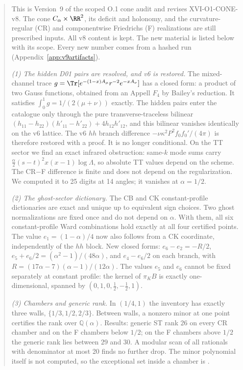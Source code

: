 \begin{abstract}
This is Version~9 of the scoped O.1 cone audit and revises
XVI-O1-CONE-v8. The cone \(C_\alpha\times\RR^2\), its deficit and
holonomy, and the curvature-regular (CR) and componentwise
Friedrichs (F) realizations are still prescribed inputs. All v8
content is kept. The new material is listed below with its scope.
Every new number comes from a hashed run
(Appendix~\ref{app:v9artifacts}).

\emph{(1) The hidden D01 pairs are resolved, and v6 is restored.}
The mixed-channel trace
\(g=\Tr[e^{-(1-x)A_\mu}r^{-2}e^{-xA_\nu}]\) has a closed form: a
product of two Gauss functions, obtained from an Appell \(F_4\)
by Bailey's reduction. It satisfies \(\int_0^1g=1/(2(\mu+\nu))\)
exactly. The hidden pairs enter the catalogue only through the
pure transverse-traceless bilinear
\((h_{11}-h_{22})(h'_{11}-h'_{22})+4h_{12}h'_{12}\), and this
bilinear vanishes identically on the v6 lattice. The v6 \(hh\)
branch difference \(-\nu\kappa^2P^2f_0f_0'/(4\pi)\) is therefore
restored with a proof. It is no longer conditional.
On the TT sector we find an exact infrared obstruction: same-\(k\)
mode sums carry \(\tfrac{\alpha}{2}(s-t)^2x(x-1)\log\Lambda\), so
absolute TT values depend on the scheme. The CR\(-\)F difference
is finite and does not depend on the regularization. We computed
it to 25 digits at 14 angles; it vanishes at \(\alpha=1/2\).

\emph{(2) The ghost-sector dictionary.} The CB and CK
constant-profile dictionaries are exact and unique up to
equivalent sign choices. Two ghost normalizations are fixed once
and do not depend on \(\alpha\). With them, all six
constant-profile Ward combinations hold exactly at all four
certified points. The value \(e_1=(1-\alpha)/4\) now also follows
from a CK coordinate, independently of the \(hh\) block. New
closed forms: \(e_6-e_2=-R/2\), \(e_5+e_6/2=(\alpha^2-1)/(48\alpha)\),
and \(e_4-e_6/2\) on each branch, with
\(R=(17\alpha-7)(\alpha-1)/(12\alpha)\). The values \(e_5\) and
\(e_6\) cannot be fixed separately at constant profile: the kernel
of \(\pi_KB\) is exactly one-dimensional, spanned by
\((0,1,0,\tfrac12,-\tfrac12,1)\).

\emph{(3) Chambers and generic rank.} In \((1/4,1)\) the inventory
has exactly three walls, \(\{1/3,1/2,2/3\}\). Between walls, a
nonzero minor at one point certifies the rank over
\(\mathbb Q(\alpha)\). Results: generic ST rank \(26\) on every CR
chamber and on the F chambers below \(1/2\); on the F chambers
above \(1/2\) the generic rank lies between \(29\) and \(30\). A
modular scan of all rationals with denominator at most 20 finds
no further drop. The minor polynomial itself is not computed, so
the exceptional set inside a chamber is \OPEN.


\end{abstract}
